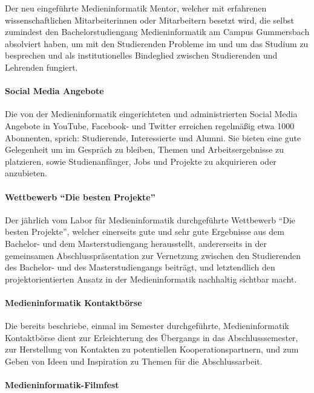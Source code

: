 Der neu eingeführte Medieninformatik Mentor, welcher mit erfahrenen
wissenschaftlichen Mitarbeiterinnen oder Mitarbeitern besetzt wird, die
selbst zumindest den Bachelorstudiengang Medieninformatik am Campus
Gummersbach absolviert haben, um mit den Studierenden Probleme im und um
das Studium zu besprechen und als institutionelles Bindeglied zwischen
Studierenden und Lehrenden fungiert.

\paragraph{Social Media Angebote}\label{social-media-angebote}

Die von der Medieninformatik eingerichteten und administrierten Social
Media Angebote in YouTube, Facebook- und Twitter erreichen regelmäßig
etwa 1000 Abonnenten, sprich: Studierende, Interessierte und Alumni. Sie
bieten eine gute Gelegenheit um im Gespräch zu bleiben, Themen und
Arbeitsergebnisse zu platzieren, sowie Studienanfänger, Jobs und
Projekte zu akquirieren oder anzubieten.

\paragraph{\texorpdfstring{Wettbewerb ``Die besten
Projekte''}{Wettbewerb Die besten Projekte}}\label{wettbewerb-die-besten-projekte}

Der jährlich vom Labor für Medieninformatik durchgeführte Wettbewerb
``Die besten Projekte'', welcher einerseits gute und sehr gute
Ergebnisse aus dem Bachelor- und dem Masterstudiengang herausstellt,
andererseits in der gemeinsamen Abschlusspräsentation zur Vernetzung
zwischen den Studierenden des Bachelor- und des Masterstudiengangs
beiträgt, und letztendlich den projektorientierten Ansatz in der
Medieninformatik nachhaltig sichtbar macht.

\paragraph{Medieninformatik
Kontaktbörse}\label{medieninformatik-kontaktbuxf6rse}

Die bereits beschriebe, einmal im Semester durchgeführte,
Medieninformatik Kontaktbörse dient zur Erleichterung des Übergangs in
das Abschlusssemester, zur Herstellung von Kontakten zu potentiellen
Kooperationspartnern, und zum Geben von Ideen und Inspiration zu Themen
für die Abschlussarbeit.

\paragraph{Medieninformatik-Filmfest}\label{medieninformatik-filmfest}


